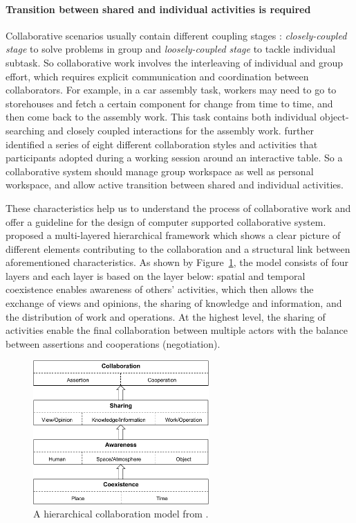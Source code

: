 \paragraph{Transition between shared and individual activities is required} Collaborative scenarios usually contain different coupling stages \citep{Gutwin1998Design, Lissermann2014PMC}: \textit{closely-coupled stage} to solve problems in group and \textit{loosely-coupled stage} to tackle individual subtask. So collaborative work involves the interleaving of individual and group effort, which requires explicit communication and coordination between collaborators. For example, in a car assembly task, workers may need to go to storehouses and fetch a certain component for change from time to time, and then come back to the assembly work. This task contains both individual object-searching and closely coupled interactions for the assembly work. \citet{Isenberg2012Co} further identified a series of eight different collaboration styles and activities that participants adopted during a working session around an interactive table. So a collaborative system should manage group workspace as well as personal workspace, and allow active transition between shared and individual activities.

These characteristics help us to understand the process of collaborative work and offer a guideline for the design of computer supported collaborative system. \citet{Okada2007Collab} proposed a multi-layered hierarchical framework which shows a clear picture of different elements contributing to the collaboration and a structural link between aforementioned characteristics. As shown by Figure~\ref{fig:1_collab_model}, the model consists of four layers and each layer is based on the layer below: spatial and temporal coexistence enables awareness of others' activities, which then allows the exchange of views and opinions, the sharing of knowledge and information, and the distribution of work and operations. At the highest level, the sharing of activities enable the final collaboration between multiple actors with the balance between assertions and cooperations (negotiation).

\begin{figure}[htb]
  \centering
  \includegraphics[width=0.6\textwidth]{figures/ch1/collab_model}
  \caption{\label{fig:1_collab_model}A hierarchical collaboration model from \citet{Okada2007Collab}.}
\end{figure}

